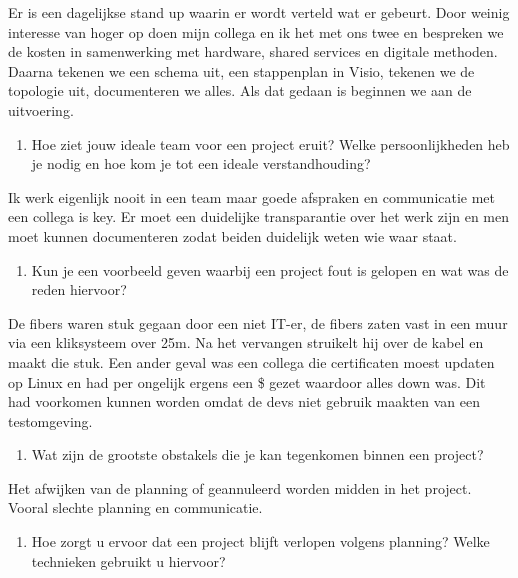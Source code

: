 \documentclass{hogent-article}
\begin{document}
    Er is een dagelijkse stand up waarin er wordt verteld wat er gebeurt. Door weinig interesse van hoger op doen mijn collega en ik het met ons twee en bespreken we de kosten in samenwerking met hardware, shared services en digitale methoden. Daarna tekenen we een schema uit, een stappenplan in Visio, tekenen we de topologie uit, documenteren we alles. Als dat gedaan is beginnen we aan de uitvoering.\\
    
    \begin{enumerate}[resume]\bfseries
        \item Hoe ziet jouw ideale team voor een project eruit? Welke persoonlijkheden heb je nodig en hoe kom je tot een ideale verstandhouding?  
    \end{enumerate}

    Ik werk eigenlijk nooit in een team maar goede afspraken en communicatie met een collega is key. Er moet een duidelijke transparantie over het werk zijn en men moet kunnen documenteren zodat beiden duidelijk weten wie waar staat.
    
    \begin{enumerate}[resume]\bfseries
        \item Kun je een voorbeeld geven waarbij een project fout is gelopen en wat was de reden hiervoor?  
    \end{enumerate}
    
    De fibers waren stuk gegaan door een niet IT-er, de fibers zaten vast in een muur via een kliksysteem over 25m. Na het vervangen struikelt hij over de kabel en maakt die stuk. Een ander geval was een collega die certificaten moest updaten op Linux en had per ongelijk ergens een \$ gezet waardoor alles down was. Dit had voorkomen kunnen worden omdat de devs niet gebruik maakten van een testomgeving.\\
    
    \begin{enumerate}[resume]\bfseries
        \item Wat zijn de grootste obstakels die je kan tegenkomen binnen een project?  
    \end{enumerate}
    
    Het afwijken van de planning of geannuleerd worden midden in het project. Vooral slechte planning en communicatie.\\
    
    \begin{enumerate}[resume]\bfseries
        \item Hoe zorgt u ervoor dat een project blijft verlopen volgens planning? Welke technieken gebruikt u hiervoor? 
    \end{enumerate}
    
\end{document}
